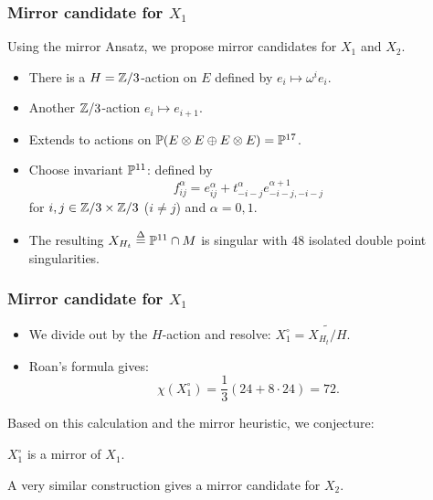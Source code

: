 \begin{frame}
\frametitle{Mirror candidate for $X_1$}

Using the mirror Ansatz, we propose mirror candidates for $X_1$ and $X_2$.

\begin{itemize}
	\item There is a $H=\Z/3$-action on $E$ defined by $e_i \mapsto \omega^i e_i$.
	\item Another $\Z/3$-action $e_i \mapsto e_{i+1}$.
	\item Extends to actions on $\P(E \otimes E \oplus E \otimes E)=\P^{17}$.
	\item Choose invariant $\P^{11}$: defined by
	$$
	f_{ij}^\alpha = e_{ij}^\alpha + t_{-i-j}^\alpha e_{-i-j,-i-j}^{\alpha+1}
	$$
	for $i,j \in \Z/3 \times \Z/3$ ($i \neq j$) and $\alpha = 0,1$.
	\item The resulting $X_{H_t} \stackrel \Delta = \P^{11} \cap M$ is singular with $48$ isolated double point singularities.
\end{itemize}

\end{frame}


\begin{frame}
\frametitle{Mirror candidate for $X_1$}

\begin{itemize}
	\item We divide out by the $H$-action and resolve: $X_1^\circ = \widetilde{X_{H_t}/H}$.
	\item Roan's formula gives:
	$$
	\chi(X_1^\circ) = \frac{1}{3}\left( 24 + 8 \cdot 24 \right) = 72.
	$$
\end{itemize}

Based on this calculation and the mirror heuristic, we conjecture:

\begin{conjecture}
$X_1^\circ$ is a mirror of $X_1$.
\end{conjecture}

\begin{remark}
A very similar construction gives a mirror candidate for $X_2$.
\end{remark}

\end{frame}